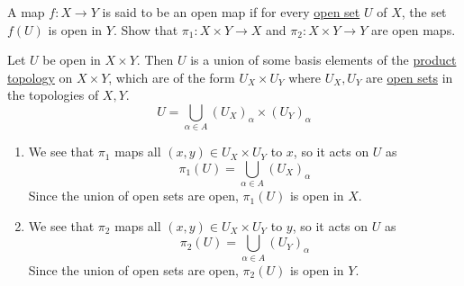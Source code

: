   \begin{exercise}[Munkres 16.4]
    A map $f : X \to Y$ is said to be an open map if for every \hyperref[def:open-set]{open set} $U$ of $X$, the set $f(U)$ is open in $Y$. Show that $\pi_1 : X \times Y \to X$ and $\pi_2 : X \times Y \to Y$ are open maps.
  \end{exercise}
  \begin{solution}[Munkres 16.4] 
    Let $U$ be open in $X \times Y$. Then $U$ is a union of some basis elements of the \hyperref[def:product-topology]{product topology} on $X \times Y$, which are of the form $U_X \times U_Y$ where $U_X, U_Y$ are \hyperref[def:open-set]{open sets} in the topologies of $X, Y$. 
    \begin{equation}
      U = \bigcup_{\alpha \in A} (U_X)_\alpha  \times (U_Y)_\alpha
    \end{equation} 
    \begin{enumerate}
      \item We see that $\pi_1$ maps all $(x, y) \in U_X \times U_Y$ to $x$, so it acts on $U$ as 
      \begin{equation}
        \pi_1(U) = \bigcup_{\alpha \in A} (U_X)_\alpha
      \end{equation} 
      Since the union of open sets are open, $\pi_1 (U)$ is open in $X$. 

      \item We see that $\pi_2$ maps all $(x, y) \in U_X \times U_Y$ to $y$, so it acts on $U$ as 
      \begin{equation}
        \pi_2(U) = \bigcup_{\alpha \in A} (U_Y)_\alpha
      \end{equation} 
      Since the union of open sets are open, $\pi_2 (U)$ is open in $Y$. 
    \end{enumerate}
  \end{solution}

